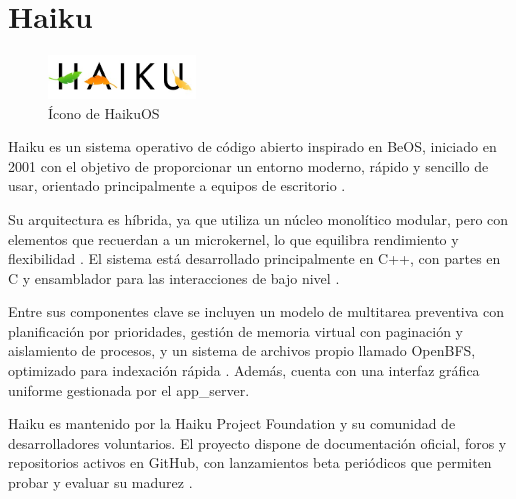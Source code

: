 \section{Haiku}

\begin{figure}[H]
    \centering
    \includegraphics[width=0.35\textwidth]{figures/haiku.jpeg}
    \caption[Ícono de HaikuOS]%
            {Ícono de HaikuOS\citep{haikuos2025}}
    \label{fig:haiku}
\end{figure}

Haiku es un sistema operativo de código abierto inspirado en BeOS, iniciado en 2001 con el objetivo de proporcionar un entorno moderno, rápido y sencillo de usar, orientado principalmente a equipos de escritorio \citep{haiku2025}.  

Su arquitectura es híbrida, ya que utiliza un núcleo monolítico modular, pero con elementos que recuerdan a un microkernel, lo que equilibra rendimiento y flexibilidad \citep{haikudevdocs}. El sistema está desarrollado principalmente en C++, con partes en C y ensamblador para las interacciones de bajo nivel \citep{haikudevdocs}.  

Entre sus componentes clave se incluyen un modelo de multitarea preventiva con planificación por prioridades, gestión de memoria virtual con paginación y aislamiento de procesos, y un sistema de archivos propio llamado OpenBFS, optimizado para indexación rápida \citep{haikufs}. Además, cuenta con una interfaz gráfica uniforme gestionada por el app\_server.  

Haiku es mantenido por la Haiku Project Foundation y su comunidad de desarrolladores voluntarios. El proyecto dispone de documentación oficial, foros y repositorios activos en GitHub, con lanzamientos beta periódicos que permiten probar y evaluar su madurez \citep{haikucommunity}.
